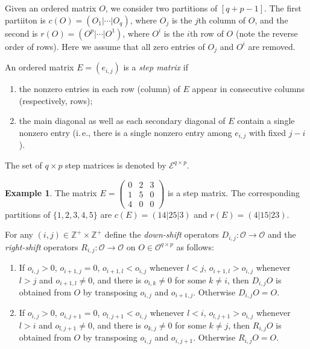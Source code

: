 \documentclass[a4paper,12pt]{amsart}
\newcommand{\ZZ}{\mathbb Z}
\theoremstyle{definition}
\newtheorem{example}[formula]{Example}
\theoremstyle{remark}
\numberwithin{equation}{section}
\begin{document}
Given an ordered matrix $O$, we consider two partitions of $[q+p-1]$. The first partiiton is $c(O) = (O_1 | \cdots | O_q)$,
where $O_j$ is the $j$th column of $O$, and the second is $r(O) = (O^p | \cdots | O^1)$, where $O^i$ is the $i$th row of $O$ (note the reverse order of rows).
Here we assume that all zero entries of $O_j$ and $O^i$ are removed.

An ordered matrix $E=(e_{i,j})$ is a \textit{step matrix} if
\begin{enumerate}
\item[(1)] the nonzero entries in each row (column) of $E$ appear in consecutive columns (respectively, rows);
\item[(2)] the main diagonal as well as each secondary diagonal of $E$ contain a single nonzero entry (i.\,e., there is a single nonzero entry among $e_{i,j}$ with fixed $j-i$).
\end{enumerate}
The set of $q \times p$ step matrices is denoted by $\mathcal{E}^{q \times p}$.

\begin{example}\label{example1}
The matrix $E = \begin{pmatrix}
0 & 2 & 3 \\
1 & 5 & 0 \\
4 & 0 & 0
\end{pmatrix}$ is a step matrix. The corresponding partitions of $\{1,2,3,4,5\}$ are $c(E) = (14| 25| 3)$ and $r(E) = (4| 15| 23)$.
\end{example}

For any $(i, j) \in \ZZ^+ \times \ZZ^+$ define the \textit{down-shift} operators $D_{i,j}\colon \mathcal{O} \to \mathcal{O}$ and the \textit{right-shift} operators
$R_{i,j} \colon \mathcal{O} \to \mathcal{O}$
on $O \in \mathcal{O}^{q \times p}$ as follows:
\begin{enumerate}
\item[1)] If $o_{i,j}>0$, $o_{i+1, j} = 0$, $o_{i+1, l} < o_{i,j}$ whenever $l < j$, $o_{i+1, l} > o_{i,j}$ whenever $l > j$ and $o_{i+1, l} \neq 0$,
and there is $o_{i, k} \neq 0$ for some $k \neq i$, then
$D_{i,j}O$ is obtained from $O$ by transposing $o_{i, j}$ and $o_{i+1, j}$.
Otherwise $D_{i,j} O = O$.

\item[2)] If $o_{i,j}>0$, $o_{i, j+1} = 0$, $o_{l, j+1} < o_{i,j}$ whenever $l < i$, $o_{l, j+1} > o_{i,j}$ whenever $l > i$ and $o_{l, j+1} \neq 0$,
and there is $o_{k, j} \neq 0$ for some $k \neq j$, then
$R_{i,j}O$ is obtained from $O$ by transposing $o_{i, j}$ and $o_{i, j+1}$.
Otherwise $R_{i,j} O = O$.
\end{enumerate}
\end{document}
